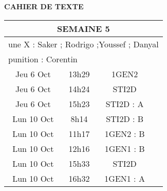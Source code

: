 \documentclass[10pt]{article}
\newcommand{\mypage}[1]{ 
		\begin{minipage}[c]{0.45\textwidth}
			\vspace{5pt}
			{#1}
			\vspace{5pt}
		\end{minipage}
}
\newcommand{\seancea}{\mypage{
	\phantom{}
	}}
\newcommand{\seanceb}{\mypage{}}
\newcommand{\seancec}{\mypage{}}
\newcommand{\seanced}{\mypage{}}
\newcommand{\seancee}{\mypage{}}
\newcommand{\seancef}{\mypage{}}
\begin{document}
\begin{center}
	\textbf{CAHIER DE TEXTE}
\end{center}

\setlength{\tabcolsep}{13pt}
\renewcommand{\arraystretch}{2.5}
\begin{longtable}{@{}|c|c|c|c|@{}} \toprule
	\midrule\multicolumn{4}{||c||}{SEMAINE 5}                       \\\midrule
	\multicolumn{4}{|l|}{une X : Saker ; Rodrigo ;Youssef ; Danyal} \\\midrule
	\multicolumn{4}{|l|}{punition : Corentin}                       \\\midrule
	Jeu 6 Oct  & 13h29 & 1GEN2     & \seancea                       \\\midrule
	Jeu 6 Oct  & 14h24 & STI2D     & \seanceb                       \\\midrule
	Jeu 6 Oct  & 15h23 & STI2D : A & \seancec                       \\\midrule\midrule
	Lun 10 Oct & 8h14  & STI2D : B & \seanced                       \\\midrule
	Lun 10 Oct & 11h17 & 1GEN2 : B & \seanced                       \\\midrule
	Lun 10 Oct & 12h16 & 1GEN1 : B & \seancee                       \\\midrule
	Lun 10 Oct & 15h33 & STI2D     & \seancef                       \\\midrule
	Lun 10 Oct & 16h32 & 1GEN1 : A & \seancef                       \\\midrule


	\bottomrule
\end{longtable}
\end{document}

